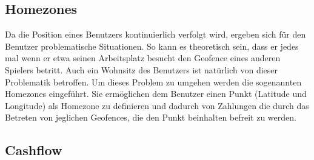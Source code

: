 \documentclass{scrreprt}
\begin{document}
\subsection{Homezones}
Da die Position eines Benutzers kontinuierlich verfolgt wird, ergeben sich für den Benutzer problematische Situationen. So kann es theoretisch sein, dass er jedes mal wenn er etwa seinen Arbeitsplatz besucht den Geofence eines anderen Spielers betritt. Auch ein Wohnsitz des Benutzers ist natürlich von dieser Problematik betroffen. Um dieses Problem zu umgehen werden die sogenannten Homezones eingeführt. Sie ermöglichen dem Benutzer einen Punkt (Latitude und Longitude) als Homezone zu definieren und dadurch von Zahlungen die durch das Betreten von jeglichen Geofences, die den Punkt beinhalten befreit zu werden.

\subsection{Cashflow}
\end{document}

